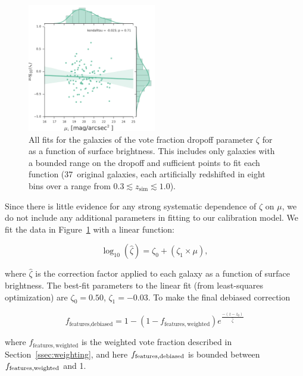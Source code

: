 \documentclass[a4paper,fleqn,usenatbib]{mnras}
\begin{document}
\begin{figure}
\center
\includegraphics[width=0.5\textwidth]{figures/zeta_mu.pdf}
\caption{All fits for the \ferengi{} galaxies of the vote fraction dropoff
parameter $\zeta$ for \ffeatures{} as a function of surface brightness. This
includes only galaxies with a bounded range on the dropoff
 and sufficient points to fit each function (37~original
galaxies, each artificially redshifted in eight bins over a range from $0.3\lesssim z_\mathrm{sim}\lesssim1.0$).}
\label{fig:zeta_mu}
\end{figure}

Since there is little evidence for any strong systematic dependence of $\zeta$
on $\mu$, we do not include any additional parameters in fitting to our
calibration model.  We fit the data in Figure~\ref{fig:zeta_mu} with a linear
function:

\begin{equation}
\log_{10}(\hat\zeta) = \zeta_0 + (\zeta_1 \times \mu),
\label{eqn:zetafit}
\end{equation}

\noindent where $\hat\zeta$ is the correction factor applied to each galaxy as
a function of surface brightness. The best-fit parameters to the linear fit
(from least-squares optimization) are $\zeta_0=0.50$, $\zeta_1=-0.03$. To make the
final debiased correction 

\begin{equation}
f_\textrm{features,debiased} = 1 - (1 - f_\mathrm{features,weighted})e^{\frac{-(z-z_0)}{\hat\zeta}}
\label{eqn:fzeta_mod}
\end{equation}

\noindent where $f_\mathrm{features,weighted}$ is the weighted vote fraction
described in Section~\ref{ssec:weighting}, and here $f_{\rm features,debiased}$ is bounded 
between $f_{\rm features,weighted}$ and 1.
\end{document}
